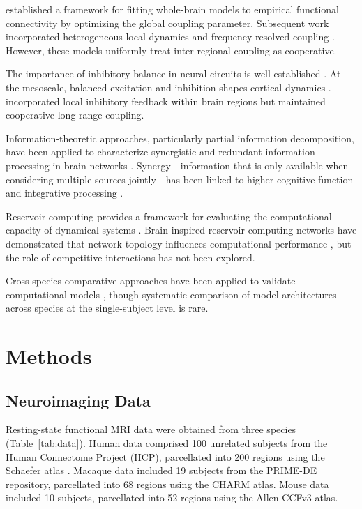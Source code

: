 \documentclass[11pt]{article}
\begin{document}
\citet{deco2013resting} established a framework for fitting whole-brain models to empirical functional connectivity by optimizing the global coupling parameter. Subsequent work incorporated heterogeneous local dynamics \citep{demirtas2019hierarchical, wang2019inversion} and frequency-resolved coupling \citep{cabral2017functional}. However, these models uniformly treat inter-regional coupling as cooperative.

The importance of inhibitory balance in neural circuits is well established \citep{vreeswijk1996chaos, brunel2000dynamics}. At the mesoscale, balanced excitation and inhibition shapes cortical dynamics \citep{shu2003turning, haider2006neocortical}. \citet{deco2014local} incorporated local inhibitory feedback within brain regions but maintained cooperative long-range coupling.

Information-theoretic approaches, particularly partial information decomposition, have been applied to characterize synergistic and redundant information processing in brain networks \citep{timme2018synergy, luppi2022synergistic}. Synergy---information that is only available when considering multiple sources jointly---has been linked to higher cognitive function and integrative processing \citep{mediano2021towards}.

Reservoir computing provides a framework for evaluating the computational capacity of dynamical systems \citep{jaeger2004harnessing, maass2002real}. Brain-inspired reservoir computing networks have demonstrated that network topology influences computational performance \citep{suarez2021learning}, but the role of competitive interactions has not been explored.

Cross-species comparative approaches have been applied to validate computational models \citep{mantini2013default, mars2018whole}, though systematic comparison of model architectures across species at the single-subject level is rare.

\section{Methods}

\subsection{Neuroimaging Data}

Resting-state functional MRI data were obtained from three species (Table~\ref{tab:data}). Human data comprised 100 unrelated subjects from the Human Connectome Project (HCP), parcellated into 200 regions using the Schaefer atlas \citep{schaefer2018local}. Macaque data included 19 subjects from the PRIME-DE repository, parcellated into 68 regions using the CHARM atlas. Mouse data included 10 subjects, parcellated into 52 regions using the Allen CCFv3 atlas.
\end{document}
